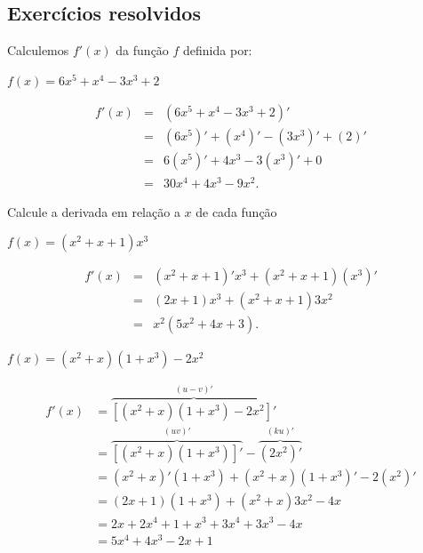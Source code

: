 \cleardoublepage\documentclass[../main.tex]{subfiles}
\begin{document}
\subsection{Exercícios resolvidos}
\begin{exeresol}
  Calculemos \(f'(x)\) da função \(f\) definida por:

\(f(x)=6x^5+x^4-3x^3+2\)\\
\begin{resol}
  \[ \begin{array}{rcl} f'(x) &=& (6x^5+x^4-3x^3+2)'\\ &=& (6x^5)'+(x^4)'-(3x^3)'+(2)'\\ &=& 6(x^5)'+4x^3-3(x^3)'+0\\ &=& 30x^4+4x^3-9x^2. \end{array} \]
\end{resol}
\end{exeresol}
\begin{exeresol}
  Calcule a derivada em relação a $x$ de cada função
  \begin{compactenum}[a)]
  \item \(f(x)=(x^2+x+1)x^3\)\\
  \begin{resol}
    \[ \begin{array}{rcl} f'(x) &=& (x^2+x+1)'x^3 + (x^2+x+1)(x^3)'\\ &=& (2x+1)x^3 + (x^2+x+1)3x^2\\ &=& x^2(5x^2 +4x +3). \end{array} \]
  \end{resol}
  \item \(    f(x) = (x^2+x)(1 + x^3) - 2x^2\)\\
    \begin{resol}
  \begin{align*}
    f'(x) &= \overbrace{\left[(x^2+x)(1 + x^3) - 2x^2\right]'}^{(u-v)'} \\
          &= \overbrace{\left[(x^2+x)(1 + x^3)\right]'}^{(uv)'} - \overbrace{(2x^2)'}^{(ku)'} \\
          &= (x^2+x)'(1+x^3) + (x^2+x)(1+x^3)' - 2(x^2)'\\
          &= (2x+1)(1+x^3) + (x^2+x)3x^2 - 4x\\
          &= 2x+2x^4+1+x^3+3x^4+3x^3-4x\\
          &= 5x^4+4x^3-2x+1
  \end{align*}
    \end{resol}
  \end{compactenum}
  \end{exeresol}
\end{document}
